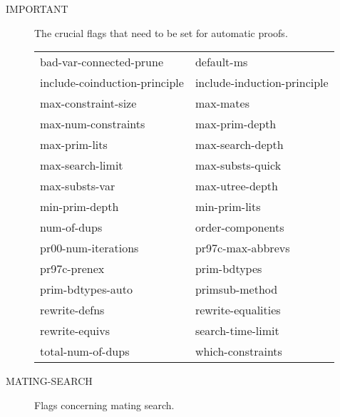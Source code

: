 \begin{description} 
\item[IMPORTANT]  
The crucial flags that need to be set for automatic proofs.

\begin{tabular}{l l}
bad-var-connected-prune&default-ms\\
include-coinduction-principle&include-induction-principle\\
max-constraint-size&max-mates\\
max-num-constraints&max-prim-depth\\
max-prim-lits&max-search-depth\\
max-search-limit&max-substs-quick\\
max-substs-var&max-utree-depth\\
min-prim-depth&min-prim-lits\\
num-of-dups&order-components\\
pr00-num-iterations&pr97c-max-abbrevs\\
pr97c-prenex&prim-bdtypes\\
prim-bdtypes-auto&primsub-method\\
rewrite-defns&rewrite-equalities\\
rewrite-equivs&search-time-limit\\
total-num-of-dups&which-constraints\\
\end{tabular}

\item[MATING-SEARCH]  
Flags concerning mating search.


\end{description}
